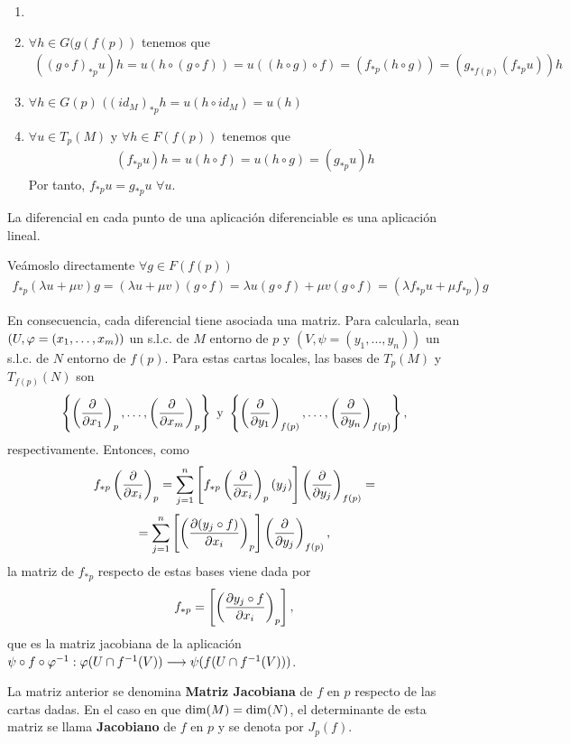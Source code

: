 \documentclass[cursovd_portada.tex]{subfiles}
\begin{document}
\begin{dem}
\begin{enumerate}
\item[]
\item $\forall h \in G(g(f(p))$ tenemos que 
\begin{gather*}
((g\circ f)_{\ast p}u)h = u(h\circ(g \circ f)) = u ((h\circ g) \circ f) = (f_{\ast p}(h \circ g)) = (g_{\ast f(p)}(f_{\ast p} u))h
\end{gather*}
\item $\forall h \in G(p)$ $((id_M)_{\ast p}h = u(h \circ id_M) = u(h)$
\item $\forall u \in T_p(M)$ y $\forall h\in F(f(p))$ tenemos que 
\begin{gather*}
(f_{\ast p}u)h = u(h\circ f)=u(h \circ g) = (g_{\ast p} u)h
\end{gather*}
Por tanto, $f_{\ast p}u=g_{\ast p}u$ $\forall u$.
\end{enumerate}
\end{dem}
\begin{prop}
La diferencial en cada punto de una aplicación diferenciable es una aplicación lineal.
\end{prop}
\begin{dem}
Veámoslo directamente $\forall g\in F(f(p))$
\begin{gather*}
 f_{\ast p}(\lambda u+\mu v)g = (\lambda u+\mu v)(g\circ f)= \lambda u(g \circ f)+\mu v(g \circ f) = (\lambda f_{\ast p} u + \mu f_{\ast p})g
\end{gather*}
\end{dem}
En consecuencia, cada diferencial tiene asociada una matriz. Para calcularla, sean $(U,\varphi=(x_1,\dots ,x_m))$ un
s.l.c. de $M$ entorno de $p$ y $(V,\psi=(y_1,\dots ,y_n))$ un s.l.c. de $N$ entorno de $f(p)$. Para estas cartas
locales, las bases de $T_p(M)$ y $T_{f(p)}(N)$ son
$$\left\{\left(\displaystyle{\frac{\partial}{\partial x_1}}\right)_p,\dots ,\left(\displaystyle{\frac{\partial}{\partial x_m}}\right)_p\right\}\mbox{ }{\rm y}\mbox{
}\left\{\left(\displaystyle{\frac{\partial}{\partial y_1}}\right)_{f(p)},\dots ,\left(\displaystyle{\frac{\partial}{\partial y_n}}\right)_{f(p)}\right\},$$ respectivamente. Entonces,
como
$$f_{*p}\left(\displaystyle{\frac{\partial}{\partial x_i}}\right)_p=\sum_{j=1}^n\left[f_{*p}\left(\displaystyle{\frac{\partial}{\partial x_i}}\right)_p(y_j)\right]\left(\displaystyle{\frac{\partial}{\partial y_j}}
\right)_{f(p)}=$$ $$=\sum_{j=1}^n\left[\left(\displaystyle{\frac{\partial (y_j\circ f)}{\partial x_i}}\right)_p\right]\left(\displaystyle{\frac{\partial}{\partial y_j}}
\right)_{f(p)},$$ la matriz de $f_{*p}$ respecto de estas bases viene dada por
$$f_{*p}=\left[\left(\displaystyle{\frac{\partial y_j\circ f}{\partial x_i}}\right)_p\right],$$
que es la matriz jacobiana de la aplicación $\psi\circ f\circ\varphi^{-1}:\varphi(U\cap f^{-1}(V))\longrightarrow\psi(f(U\cap
f^{-1}(V)))$.
\begin{defi}
La matriz anterior se denomina {\bf Matriz Jacobiana} de $f$ en $p$ respecto de las cartas dadas. En el caso en
que ${\rm dim}(M)={\rm dim}(N)$, el determinante de esta matriz se llama {\bf Jacobiano} de $f$ en $p$ y se denota
por $J_p(f)$.
\end{defi}
\end{document}
